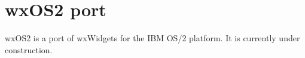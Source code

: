 \section{wxOS2 port}\label{wxos2port}

wxOS2 is a port of wxWidgets for the IBM OS/2 platform.
It is currently under construction.

